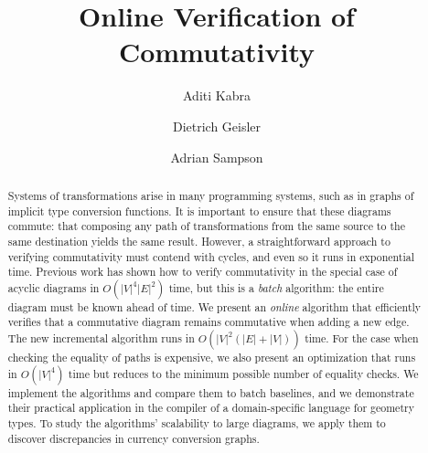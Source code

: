 \documentclass[sigplan]{acmart}
\begin{document}
\title{Online Verification of Commutativity}
%
%
\author{Aditi Kabra}

\author{Dietrich Geisler}

\author{Adrian Sampson}


\begin{abstract}
Systems of transformations arise in many programming systems, such as in graphs of implicit type conversion functions.
It is important to ensure that these diagrams commute: that composing any path of transformations from the same source to the same destination yields the same result.
However, a straightforward approach to verifying commutativity must contend with cycles, and even so it runs in exponential time.
Previous work has shown how to verify commutativity in the special case of acyclic diagrams in $O(|V|^4|E|^2)$ time,
but this is a \emph{batch} algorithm: the entire diagram must be known ahead of time.
We present an \emph{online} algorithm that efficiently verifies that a commutative diagram remains commutative when adding a new edge.
The new incremental algorithm runs in $O(|V|^2(|E| + |V|))$ time.
For the case when checking the equality of paths is expensive, we also present an optimization that runs in $O(|V|^4)$ time but reduces to the minimum possible number of equality checks.
We implement the algorithms and compare them to batch baselines, and we demonstrate their practical application in the compiler of a domain-specific language for geometry types.
To study the algorithms' scalability to large diagrams, we apply them to discover discrepancies in currency conversion graphs.
\end{abstract}


\maketitle
\end{document}
